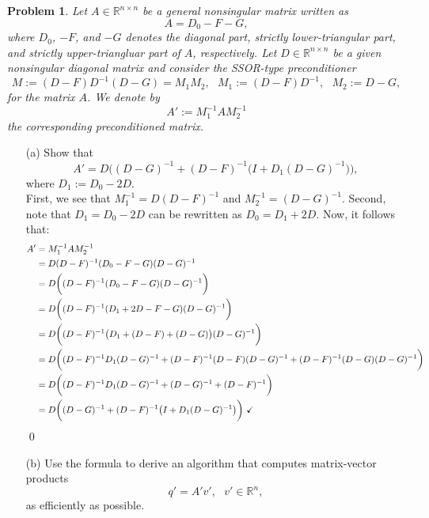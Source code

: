 \documentclass[12pt]{article}
\newtheorem{problem}{Problem}
\def\R{\mathbb{R}}
\begin{document}
\noindent
\begin{problem} Let $A \in\R^{n\times n}$ be a general nonsingular matrix written as
$$A = D_0 - F - G,$$
where $D_0$, $- F$, and $-G$ denotes the diagonal part, strictly lower-triangular part, and strictly upper-triangluar part of $A$, respectively.  Let $D\in\R^{n\times n}$ be a given nonsingular diagonal matrix and consider the SSOR-type preconditioner
$$M := (D-F)D^{-1}(D-G) = M_1 M_2, \text{ } M_1 :=(D-F)D^{-1}, \text{ } M_2:=D-G,$$
for the matrix $A$.  We denote by
$$A' := M_1^{-1}AM_2^{-1}$$
the corresponding preconditioned matrix.
\end{problem}
\begin{itemize}
\item[(a)] Show that
$$A' = D\bigg((D-G)^{-1} + (D-F)^{-1}\big(I + D_1(D-G)^{-1}\big)\bigg),$$
where $D_1:=D_0 - 2D$.\\

First, we see that $M_1^{-1} = D(D-F)^{-1}$ and $M_2^{-1} = (D-G)^{-1}$.  Second, note that $D_1=D_0 - 2D$ can be rewritten as $D_0=D_1 + 2D$.  Now, it follows that:
\begin{align}
A' &= M_1^{-1}AM_2^{-1} \nonumber \\
&= D(D-F)^{-1}(D_0 - F - G)(D-G)^{-1} \nonumber \\
&= D\bigg((D-F)^{-1}(D_0 - F - G)(D-G)^{-1}\bigg) \nonumber \\
&= D\bigg((D-F)^{-1}(D_1 + 2D - F - G)(D-G)^{-1}\bigg) \nonumber \\
&= D\bigg((D-F)^{-1}\big(D_1 + (D- F) + (D - G)\big)(D-G)^{-1}\bigg) \nonumber \\
&=D\bigg( (D-F)^{-1}D_1(D-G)^{-1} + (D-F)^{-1}(D-F)(D-G)^{-1} + (D-F)^{-1}(D-G)(D-G)^{-1}\bigg) \nonumber \\
&= D\bigg((D-F)^{-1}D_1(D-G)^{-1} + (D-G)^{-1} + (D-F)^{-1}\bigg) \nonumber \\
&= D\bigg((D-G)^{-1} + (D-F)^{-1}\big(I + D_1(D-G)^{-1}\big)\bigg) \nonumber \text{ \checkmark} 
\end{align}
\qed\\


\item[(b)] Use the formula to derive an algorithm that computes matrix-vector products
$$q' = A'v', \text{ } v'\in\R^n,$$
as efficiently as possible.\\


\end{itemize}
\end{document}
